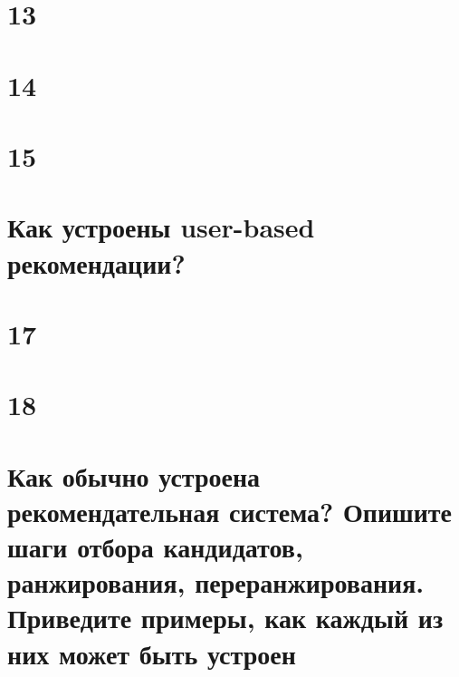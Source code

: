 \documentclass[14pt]{extarticle}
\begin{document}
	\newpage
	
	\section{13}
	
	
	\newpage
	
	\section{14}
	
	
	\section{15} %
	
	
	\newpage
	
	\section{Как устроены user-based рекомендации?}  
	
	
	\newpage
	
	\section{17} %
	
	
	\newpage
	
	\section{18} 
	
	
	\newpage
	
	\section{Как обычно устроена рекомендательная система? Опишите шаги отбора кандидатов, ранжирования, переранжирования. Приведите примеры, как каждый из них может быть устроен} 
	
\end{document}
